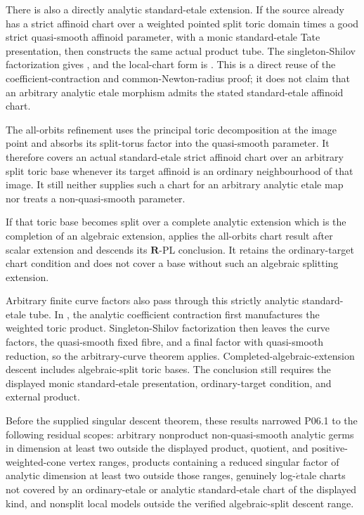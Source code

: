 There is also a directly analytic standard-etale extension.  If the source
already has a strict affinoid chart over a weighted pointed split toric
domain times a good strict quasi-smooth affinoid parameter, with a monic
standard-etale Tate presentation, then
 constructs the same
actual product tube.  The singleton-Shilov factorization gives
, and the local-chart
form is .  This is a
direct reuse of the coefficient-contraction and common-Newton-radius proof;
it does not claim that an arbitrary analytic etale morphism admits the
stated standard-etale affinoid chart.

The all-orbits refinement 
uses the principal toric decomposition at the image point and absorbs its
split-torus factor into the quasi-smooth parameter.  It therefore covers an
actual standard-etale strict affinoid chart over an arbitrary split toric
base whenever its target affinoid is an ordinary neighbourhood of that
image.  It still neither supplies such a chart for an arbitrary analytic
etale map nor treats a non-quasi-smooth parameter.

If that toric base becomes split over a complete analytic extension which is
the completion of an algebraic extension,
 applies the
all-orbits chart result after scalar extension and descends its
\(\mathbf R\)-PL conclusion.  It retains the ordinary-target chart
condition and does not cover a base without such an algebraic splitting
extension.

Arbitrary finite curve factors also pass through this strictly analytic
standard-etale tube.  In
,
the analytic coefficient contraction first manufactures the weighted toric
product.  Singleton-Shilov factorization then leaves the curve factors, the
quasi-smooth fixed fibre, and a final factor with quasi-smooth reduction, so
the arbitrary-curve theorem applies.  Completed-algebraic-extension descent
includes algebraic-split toric bases.  The conclusion still requires the
displayed monic standard-etale presentation, ordinary-target condition, and
external product.

Before the supplied singular descent theorem, these results narrowed
P06.1 to the following residual scopes:
arbitrary nonproduct non-quasi-smooth analytic germs in dimension at least
two outside the displayed product, quotient, and positive-weighted-cone
vertex ranges, products containing a reduced singular factor of analytic
dimension at least two outside those ranges, genuinely log-\(\acute{e}\)tale charts not covered by an
ordinary-etale or analytic standard-etale chart of the displayed kind, and
nonsplit local models outside the verified algebraic-split descent range.

